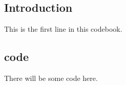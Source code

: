 \documentclass[a4paper, 12pt]{article}
\begin{document}
\begin{multicols*}{2}
\maketitle
\tableofcontents

\section{Introduction}
This is the first line in this codebook.
\subsection{code}
There will be some code here.




\end{multicols*}
\end{document}
